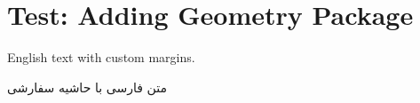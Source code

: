 \documentclass[12pt,a4paper]{article}
\begin{document}
\section*{Test: Adding Geometry Package}

English text with custom margins.

\textfarsi{متن فارسی با حاشیه سفارشی}
\end{document}
